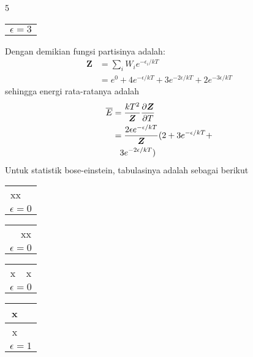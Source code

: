 \documentclass[a4paper  , 6 pt]{article}
\begin{document}
\begin{tiny}
\begin{multicols} {5}
\begin{tabular}{|c | c| }
 &   \\
\hline
\multicolumn{2}{|c|}{$\epsilon = 3$} \\ \hline
\end{tabular} \newline
Dengan demikian fungsi partisinya adalah:
\begin{align}
\boldsymbol{Z}& =\sum_i W_i e^{- \epsilon_i /kT} \nonumber \\
& = e^0 + 4 e^{- \epsilon/ kT} + 3 e^{-2\epsilon /kT} + 2 e^{-3\epsilon /kT}  
\end{align}
sehingga energi rata-ratanya adalah
\begin{align}
\overline{E}& = \frac{kT^2}{\boldsymbol{Z}} \frac{\partial \boldsymbol{Z}}{\partial T} \nonumber \\
& = \frac{2 \epsilon e^{- \epsilon /kT}}{\boldsymbol{Z}} (2 + 3 e^{- \epsilon /k T }+ \nonumber \\
& \hspace{ 0.3 cm }3 e^{- 2 \epsilon /kT})
\end{align}
Untuk statistik bose-einstein, tabulasinya adalah sebagai berikut 
\begin{tabular}{|c | c| }
 \cline{1-1}  \\ \hline
 &  \\ \hline 
xx &   \\
\hline
\multicolumn{2}{|c|}{$\epsilon = 0$} \\ \hline
\end{tabular}
\begin{tabular}{|c | c| }
 \cline{1-1}  \\ \hline
 &  \\ \hline 
 & xx  \\
\hline
\multicolumn{2}{|c|}{$\epsilon = 0$} \\ \hline
\end{tabular}
\begin{tabular}{|c | c| }
 \cline{1-1}  \\ \hline
 &  \\ \hline 
x & x  \\
\hline
\multicolumn{2}{|c|}{$\epsilon = 0$} \\ \hline
\end{tabular} \newline
\begin{tabular}{|c | c| }
 \cline{1-1}  \\ \hline
x &  \\ \hline 
x &   \\
\hline
\multicolumn{2}{|c|}{$\epsilon = 1$} \\ \hline

\end{tabular}
\end{multicols}
\end{tiny}
\end{document}
